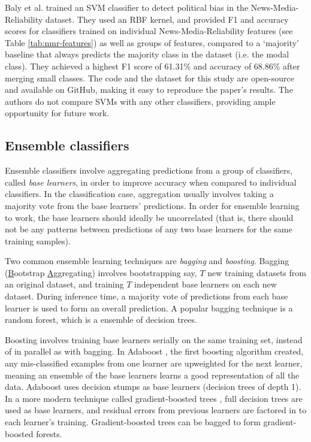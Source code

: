 Baly et al. \cite{baly-emnlp18} trained an SVM classifier to detect political bias in the News-Media-Reliability dataset. They used an RBF kernel, and provided F1 and accuracy scores for classifiers trained on individual News-Media-Reliability features (see Table \ref{tab:nmr-features}) as well as groups of features, compared to a `majority' baseline that always predicts the majority class in the dataset (i.e. the modal class). They achieved a highest F1 score of 61.31\% and accuracy of 68.86\% after merging small classes. The code and the dataset for this study are open-source and available on GitHub, making it easy to reproduce the paper's results. The authors do not compare SVMs with any other classifiers, providing ample opportunity for future work.

\subsection{Ensemble classifiers} \label{subsec:ensemble-classifiers}

Ensemble classifiers involve aggregating predictions from a group of classifiers, called \textit{base learners}, in order to improve accuracy when compared to individual classifiers. In the classification case, aggregation usually involves taking a majority vote from the base learners' predictions. In order for ensemble learning to work, the base learners should ideally be uncorrelated (that is, there should not be any patterns between predictions of any two base learners for the same training samples).

Two common ensemble learning techniques are \textit{bagging} and \textit{boosting}. Bagging (\underline{B}ootstrap \underline{Agg}regating) involves bootstrapping say, $ T $ new training datasets from an original dataset, and training $ T $ independent base learners on each new dataset. During inference time, a majority vote of predictions from each base learner is used to form an overall prediction. A popular bagging technique is a random forest, which is a ensemble of decision trees.

Boosting involves training base learners serially on the same training set, instead of in parallel as with bagging. In Adaboost \cite{adaboost}, the first boosting algorithm created, any mis-classified examples from one learner are upweighted for the next learner, meaning an ensemble of the base learners learns a good representation of all the data. Adaboost uses decision stumps as base learners (decision trees of depth 1). In a more modern technique called gradient-boosted trees \cite{gradient-boosting}, full decision trees are used as base learners, and residual errors from previous learners are factored in to each learner's training. Gradient-boosted trees can be bagged to form gradient-boosted forests.

